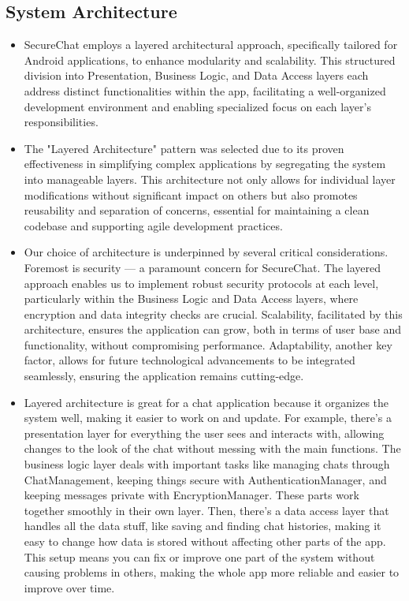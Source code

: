 \documentclass[]{article}
\begin{document}
\subsection{System Architecture}
\label{sub:system_architecture}
\begin{itemize}
	\item SecureChat employs a layered architectural approach, specifically tailored for Android applications, to enhance modularity and scalability. This structured division into Presentation, Business Logic, and Data Access layers each address distinct functionalities within the app, facilitating a well-organized development environment and enabling specialized focus on each layer's responsibilities.
	
	\item The "Layered Architecture" pattern was selected due to its proven effectiveness in simplifying complex applications by segregating the system into manageable layers. This architecture not only allows for individual layer modifications without significant impact on others but also promotes reusability and separation of concerns, essential for maintaining a clean codebase and supporting agile development practices.
	
	\item Our choice of architecture is underpinned by several critical considerations. Foremost is security — a paramount concern for SecureChat. The layered approach enables us to implement robust security protocols at each level, particularly within the Business Logic and Data Access layers, where encryption and data integrity checks are crucial. Scalability, facilitated by this architecture, ensures the application can grow, both in terms of user base and functionality, without compromising performance. Adaptability, another key factor, allows for future technological advancements to be integrated seamlessly, ensuring the application remains cutting-edge.
	
	\item Layered architecture is great for a chat application because it organizes the system well, making it easier to work on and update. For example, there's a presentation layer for everything the user sees and interacts with, allowing changes to the look of the chat without messing with the main functions. The business logic layer deals with important tasks like managing chats through ChatManagement, keeping things secure with AuthenticationManager, and keeping messages private with EncryptionManager. These parts work together smoothly in their own layer. Then, there's a data access layer that handles all the data stuff, like saving and finding chat histories, making it easy to change how data is stored without affecting other parts of the app. This setup means you can fix or improve one part of the system without causing problems in others, making the whole app more reliable and easier to improve over time.


\end{itemize}
\end{document}
